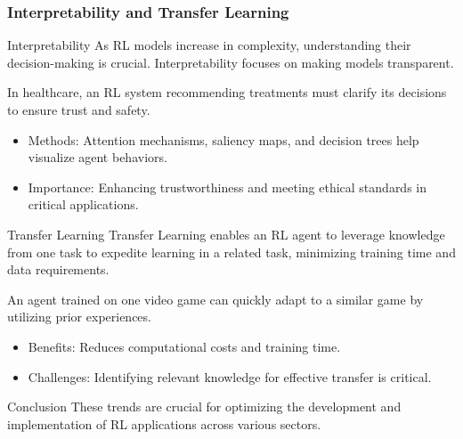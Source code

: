 \documentclass{beamer}
\begin{document}
\begin{frame}[fragile]
    \frametitle{Interpretability and Transfer Learning}

    \begin{block}{Interpretability}
        As RL models increase in complexity, understanding their decision-making is crucial. Interpretability focuses on making models transparent.
    \end{block}

    \begin{example}
        In healthcare, an RL system recommending treatments must clarify its decisions to ensure trust and safety.
    \end{example}

    \begin{itemize}
        \item Methods: Attention mechanisms, saliency maps, and decision trees help visualize agent behaviors.
        \item Importance: Enhancing trustworthiness and meeting ethical standards in critical applications.
    \end{itemize}

    \begin{block}{Transfer Learning}
        Transfer Learning enables an RL agent to leverage knowledge from one task to expedite learning in a related task, minimizing training time and data requirements.
    \end{block}

    \begin{example}
        An agent trained on one video game can quickly adapt to a similar game by utilizing prior experiences.
    \end{example}
    
    \begin{itemize}
        \item Benefits: Reduces computational costs and training time.
        \item Challenges: Identifying relevant knowledge for effective transfer is critical.
    \end{itemize}
    
    \begin{block}{Conclusion}
        These trends are crucial for optimizing the development and implementation of RL applications across various sectors.
    \end{block}
\end{frame}
\end{document}
